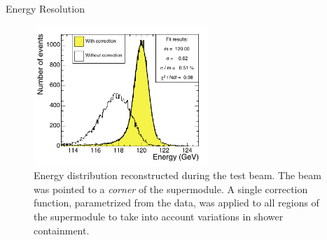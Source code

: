 \documentclass[10pt]{beamer}
\begin{document}
\begin{frame}{Energy Resolution}
    \begin{figure}
        \centering
        \includegraphics[height=150pt]{./img/resolution_2.png}
        \caption{Energy distribution reconstructed during the test beam. The beam was pointed to a \emph{corner} of the supermodule. A single correction function, parametrized from the data, was applied to all regions of the supermodule to take into account variations in shower containment.}
        \label{fig:res2}
    \end{figure}{}
\end{frame}
\end{document}
